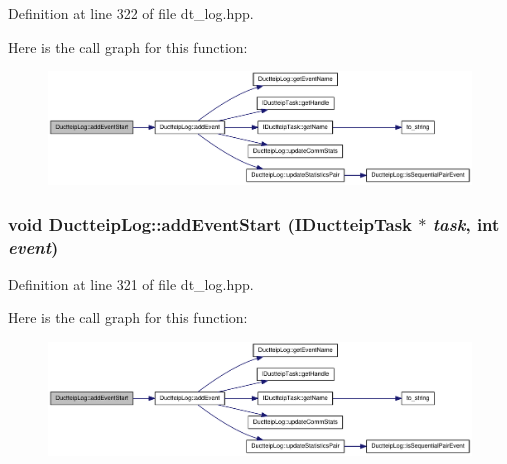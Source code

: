 Definition at line 322 of file dt\_\-log.hpp.

Here is the call graph for this function:\nopagebreak
\begin{figure}[H]
\begin{center}
\leavevmode
\includegraphics[width=371pt]{class_ductteip_log_a8dca88c37b6ae7b96a58ce6d04053fd9_cgraph}
\end{center}
\end{figure}
\hypertarget{class_ductteip_log_a6d0afadbba975c706ef756a3ba23fe47}{
\subsubsection[{addEventStart}]{\setlength{\rightskip}{0pt plus 5cm}void DuctteipLog::addEventStart ({\bf IDuctteipTask} $\ast$ {\em task}, \/  int {\em event})}}
\label{class_ductteip_log_a6d0afadbba975c706ef756a3ba23fe47}


Definition at line 321 of file dt\_\-log.hpp.

Here is the call graph for this function:\nopagebreak
\begin{figure}[H]
\begin{center}
\leavevmode
\includegraphics[width=371pt]{class_ductteip_log_a6d0afadbba975c706ef756a3ba23fe47_cgraph}
\end{center}
\end{figure}


